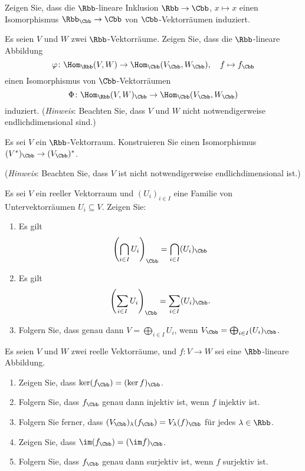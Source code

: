 \begin{question}
  Zeigen Sie, dass die $\Rbb$-lineare Inklusion $\Rbb \to \Cbb$, $x \mapsto x$ einen Isomorphismus $\Rbb_\Cbb \to \Cbb$ von $\Cbb$-Vektorräumen induziert.
\end{question}


\begin{question}
  Es seien $V$ und $W$ zwei $\Rbb$-Vektorräume.
  Zeigen Sie, dass die $\Rbb$-lineare Abbildung
  \[
    \varphi \colon \Hom_\Rbb(V, W) \to \Hom_\Cbb(V_\Cbb, W_\Cbb),
    \quad
    f \mapsto f_\Cbb
  \]
  einen Isomorphismus von $\Cbb$-Vektorräumen
  \[
    \Phi \colon \Hom_\Rbb(V, W)_\Cbb \to \Hom_\Cbb(V_\Cbb, W_\Cbb)
  \]
  induziert.
  \newline
  (\emph{Hinweis}:
   Beachten Sie, dass $V$ und $W$ nicht notwendigerweise endlichdimensional sind.)
\end{question}


\begin{question}
  Es sei $V$ ein $\Rbb$-Vektorraum.
  Konstruieren Sie einen Isomorphismus $(V^*)_\Cbb \to (V_\Cbb)^*$.
  
  (\emph{Hinweis}:
   Beachten Sie, dass $V$ ist nicht notwendigerweise endlichdimensional ist.)
\end{question}


\begin{question}\label{qst: compatibility of sums and intersections with complexification}
  Es sei $V$ ein reeller Vektorraum und $(U_i)_{i \in I}$ eine Familie von Untervektorräumen $U_i \subseteq V$.
  Zeigen Sie:
  \begin{enumerate}[leftmargin=*]
    \item
      Es gilt
      \[
            \left( \bigcap_{i \in I} U_i \right)_\Cbb
        = \bigcap_{i \in I} (U_i)_\Cbb
      \]
    \item
      Es gilt
      \[
          \left( \sum_{i \in I} U_i \right)_\Cbb
        = \sum_{i \in I} (U_i)_\Cbb.
      \]
    \item
      Folgern Sie, dass genau dann $V = \bigoplus_{i \in I} U_i$, wenn $V_\Cbb = \bigoplus_{i \in I} (U_i)_{\Cbb}$.
  \end{enumerate}
\end{question}


\begin{question}
  Es seien $V$ und $W$ zwei reelle Vektorräume, und $f \colon V \to W$ sei eine $\Rbb$-lineare Abbildung.
  \begin{enumerate}[leftmargin=*]
    \item
      Zeigen Sie, dass $\ker (f_\Cbb) = (\ker f)_\Cbb$.
    \item
      Folgern Sie, dass $f_\Cbb$ genau dann injektiv ist, wenn $f$ injektiv ist.
    \item
      Folgern Sie ferner, dass $(V_\Cbb)_\lambda(f_\Cbb) = V_\lambda(f)_\Cbb$ für jedes $\lambda \in \Rbb$.
    \item
      Zeigen Sie, dass $\im (f_\Cbb) = (\im f)_\Cbb$.
    \item
      Folgern Sie, dass $f_\Cbb$ genau dann surjektiv ist, wenn $f$ surjektiv ist.
  \end{enumerate}
\end{question}


